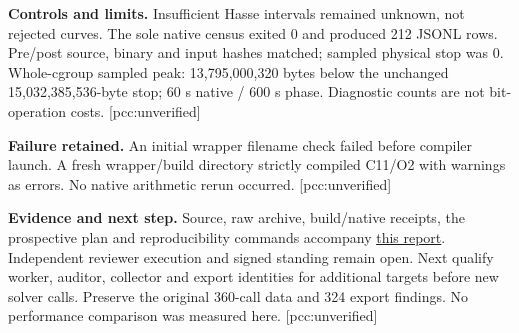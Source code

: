\documentclass[10pt,a4paper]{article}
\begin{document}
\textbf{Controls and limits.} Insufficient Hasse intervals remained unknown,
not rejected curves. The sole native census exited 0 and produced 212 JSONL
rows. Pre/post source, binary and input hashes matched; sampled physical stop
was 0. Whole-cgroup sampled peak: 13,795,000,320 bytes below the unchanged
15,032,385,536-byte stop; 60 s native / 600 s phase. Diagnostic counts are not
bit-operation costs. [pcc:unverified]

\textbf{Failure retained.} An initial wrapper filename check failed before
compiler launch. A fresh wrapper/build directory strictly compiled C11/O2
with warnings as errors. No native arithmetic rerun occurred. [pcc:unverified]

\textbf{Evidence and next step.} Source, raw archive, build/native receipts,
the prospective plan and reproducibility commands accompany
\href{https://github.com/isogeny-labs/crypto/tree/codex/hashed-ecdl-cohort-validation-20261123/research/hashed_ecdl_cohort_validation_20261123}{this report}.
Independent reviewer execution and signed standing remain open. Next qualify
worker, auditor, collector and export identities for additional targets before
new solver calls. Preserve the original 360-call data and 324 export findings.
No performance comparison was measured here. [pcc:unverified]
\end{document}
